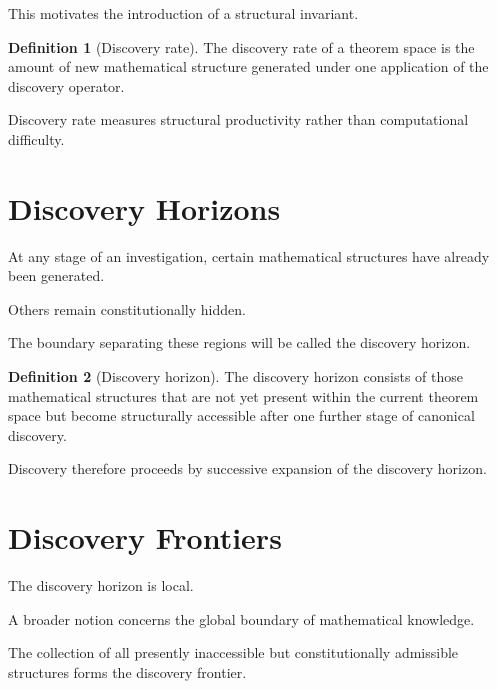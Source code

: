 \documentclass[13pt,openany]{book}
\theoremstyle{plain}
\theoremstyle{definition}
\newtheorem{definition}{Definition}[chapter]
\begin{document}
This motivates the introduction of a structural invariant.

\begin{definition}[Discovery rate]

The discovery rate of a theorem space is the amount of new mathematical
structure generated under one application of the discovery operator.

\end{definition}

Discovery rate measures structural productivity rather than computational
difficulty.

\section{Discovery Horizons}

At any stage of an investigation, certain mathematical structures have already
been generated.

Others remain constitutionally hidden.

The boundary separating these regions will be called the discovery horizon.

\begin{definition}[Discovery horizon]

The discovery horizon consists of those mathematical structures that are not
yet present within the current theorem space but become structurally accessible
after one further stage of canonical discovery.

\end{definition}

Discovery therefore proceeds by successive expansion of the discovery horizon.

\section{Discovery Frontiers}

The discovery horizon is local.

A broader notion concerns the global boundary of mathematical knowledge.

The collection of all presently inaccessible but constitutionally admissible
structures forms the discovery frontier.
\end{document}
